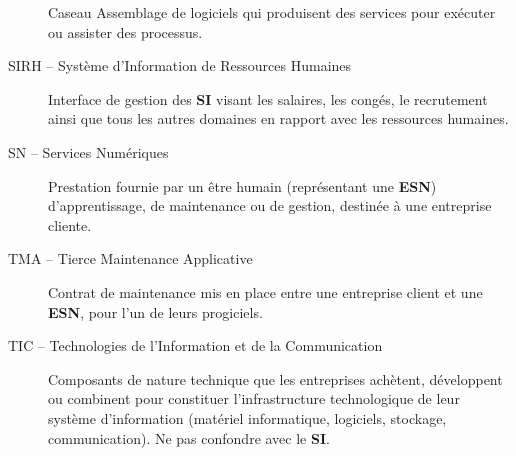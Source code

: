 \documentclass[10pt,a4paper,french]{article}
\begin{document}
\begin{description}
\begin{cquote}{Caseau}
Assemblage de logiciels qui produisent des services pour exécuter ou assister des processus.
\end{cquote}

\item[SIRH -- Système d'Information de Ressources Humaines]\label{glo:SIRH}
Interface de gestion des \textbf{SI} visant les salaires, les congés, le recrutement ainsi que tous les autres domaines en rapport avec les ressources humaines.

\item[SN -- Services Numériques]\label{glo:SN} Prestation fournie par un être humain (représentant une \textbf{ESN}) d'apprentissage, de maintenance ou de gestion, destinée à une entreprise cliente.

\item[TMA -- Tierce Maintenance Applicative]\label{glo:TMA} Contrat de maintenance mis en place entre une entreprise client et une \textbf{ESN}, pour l'un de leurs progiciels.

\item[TIC -- Technologies de l'Information et de la Communication]\label{glo:TIC} Composants de nature technique que les entreprises achètent, développent ou combinent pour constituer l'infrastructure technologique de leur système d'information (matériel informatique, logiciels, stockage, communication). Ne pas confondre avec le \textbf{SI}.

\end{description}
\end{document}
